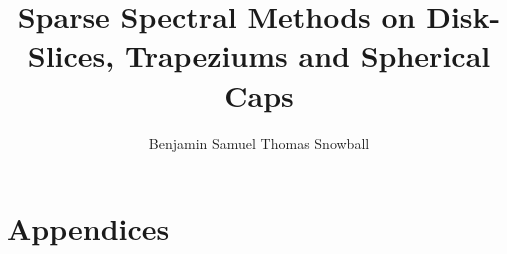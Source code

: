 \documentclass[a4paper,12pt,twoside]{report}
\begin{document}
\title{\LARGE {\bf Sparse Spectral Methods on Disk-Slices, Trapeziums and Spherical Caps}\\
 \vspace*{6mm}
}
\author{Benjamin Samuel Thomas Snowball}

\maketitle


\preface











\body







\appendix
\chapter*{Appendices}
\renewcommand{\thesection}{A}



%

\end{document}
